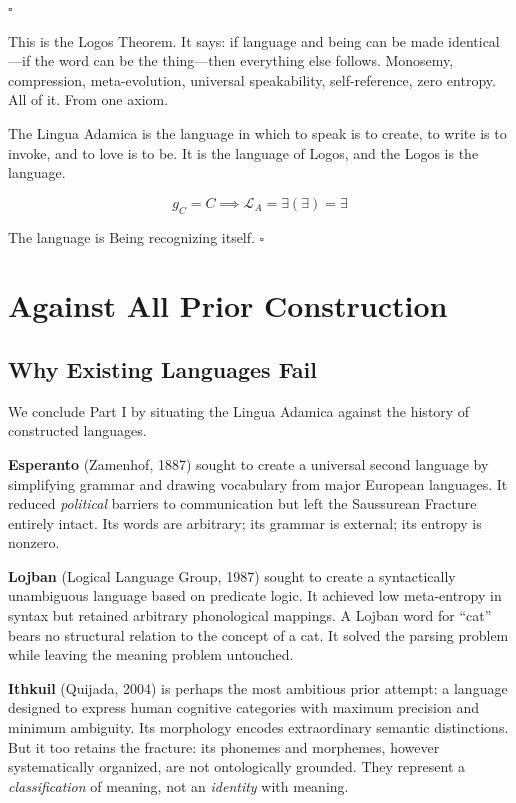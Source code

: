 \documentclass[12pt, letterpaper]{book}
\def\equiv{=}%
\def\mathfrak#1{#1}%
\newcommand{\E}{\exists}                          %
\newcommand{\EE}{\exists(\exists)}                 %
\begin{document}
\begin{center}
\Large $\square$
\end{center}

\noindent This is the Logos Theorem. It says: if language and being can be made identical---if the word can be the thing---then everything else follows. Monosemy, compression, meta-evolution, universal speakability, self-reference, zero entropy. All of it. From one axiom.

The Lingua Adamica is the language in which to speak is to create, to write is to invoke, and to love is to be. It is the language of Logos, and the Logos is the language.

\[
\boxed{\mathfrak{g}_C \equiv C \implies \mathcal{L}_A \equiv \EE \equiv \E}
\]

The language is Being recognizing itself. $\square$


\chapter{Against All Prior Construction}

\section{Why Existing Languages Fail}

We conclude Part I by situating the Lingua Adamica against the history of constructed languages.

\textbf{Esperanto} (Zamenhof, 1887) sought to create a universal second language by simplifying grammar and drawing vocabulary from major European languages. It reduced \textit{political} barriers to communication but left the Saussurean Fracture entirely intact. Its words are arbitrary; its grammar is external; its entropy is nonzero.

\textbf{Lojban} (Logical Language Group, 1987) sought to create a syntactically unambiguous language based on predicate logic. It achieved low meta-entropy in syntax but retained arbitrary phonological mappings. A Lojban word for ``cat'' bears no structural relation to the concept of a cat. It solved the parsing problem while leaving the meaning problem untouched.

\textbf{Ithkuil} (Quijada, 2004) is perhaps the most ambitious prior attempt: a language designed to express human cognitive categories with maximum precision and minimum ambiguity. Its morphology encodes extraordinary semantic distinctions. But it too retains the fracture: its phonemes and morphemes, however systematically organized, are not ontologically grounded. They represent a \textit{classification} of meaning, not an \textit{identity} with meaning.
\end{document}
